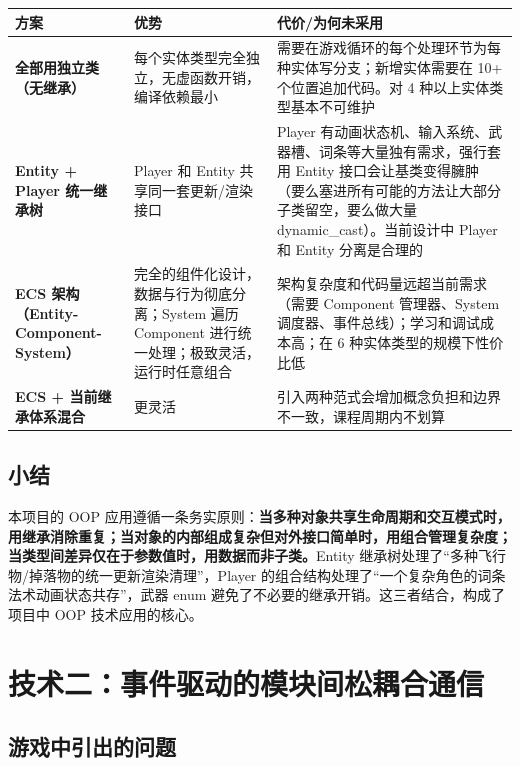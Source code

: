 \documentclass[utf8]{ctexart}
\begin{document}
\begin{longtable}{p{}p{}p{}}
\toprule
\textbf{方案} & \textbf{优势} & \textbf{代价/为何未采用} \\
\midrule
\textbf{全部用独立类（无继承）} & 每个实体类型完全独立，无虚函数开销，编译依赖最小 & 需要在游戏循环的每个处理环节为每种实体写分支；新增实体需要在 10+ 个位置追加代码。对 4 种以上实体类型基本不可维护 \\
\hline
\textbf{Entity + Player 统一继承树} & Player 和 Entity 共享同一套更新/渲染接口 & Player 有动画状态机、输入系统、武器槽、词条等大量独有需求，强行套用 Entity 接口会让基类变得臃肿（要么塞进所有可能的方法让大部分子类留空，要么做大量 dynamic\_cast）。当前设计中 Player 和 Entity 分离是合理的 \\
\hline
\textbf{ECS 架构（Entity-Component-System）} & 完全的组件化设计，数据与行为彻底分离；System 遍历 Component 进行统一处理；极致灵活，运行时任意组合 & 架构复杂度和代码量远超当前需求（需要 Component 管理器、System 调度器、事件总线）；学习和调试成本高；在 6 种实体类型的规模下性价比低 \\
\hline
\textbf{ECS + 当前继承体系混合} & 更灵活 & 引入两种范式会增加概念负担和边界不一致，课程周期内不划算 \\
\bottomrule
\end{longtable}

\subsection{小结}

本项目的 OOP 应用遵循一条务实原则：\textbf{当多种对象共享生命周期和交互模式时，用继承消除重复；当对象的内部组成复杂但对外接口简单时，用组合管理复杂度；当类型间差异仅在于参数值时，用数据而非子类。}Entity 继承树处理了“多种飞行物/掉落物的统一更新渲染清理”，Player 的组合结构处理了“一个复杂角色的词条法术动画状态共存”，武器 enum 避免了不必要的继承开销。这三者结合，构成了项目中 OOP 技术应用的核心。

\newpage

\section{技术二：事件驱动的模块间松耦合通信}

\subsection{游戏中引出的问题}
\end{document}
